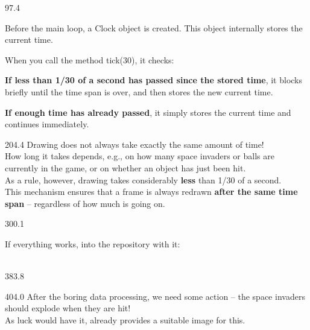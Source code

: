 \documentclass{aslab}
\begin{document}
\begin{region}[x=74.7,right=0,pitch=13.3]{97.4}
\begin{dotlist}
\item Before the main loop, a Clock object is created. This object
  internally stores the current time.
\item When you call the method tick(30), it checks:
  \begin{dotlist}
  \item \textbf{If less than 1/30 of a second has passed since the stored
    time}, it blocks briefly until the time span is over, and then stores
    the new current time.
  \item \textbf{If enough time has already passed}, it simply stores the
    current time and continues immediately.
  \end{dotlist}
\end{dotlist}
\end{region}

\begin{region}[x=74.7,right=0,pitch=13.75]{204.4}
Drawing does not always take exactly the same amount of time!\\
How long it takes depends, e.g., on how many space invaders or balls are
currently in the game, or on whether an object has just been hit.\\
As a rule, however, drawing takes considerably \textbf{less} than 1/30 of a
second.\\
This mechanism ensures that a frame is always redrawn \textbf{after the same
time span} -- regardless of how much is going on.
\end{region}

\begin{region}[pitch=13.45]{300.1}
\begin{tasks}[start=3]
\item If everything works, into the repository with it:\\
  \\
\end{tasks}
\end{region}

\begin{region}{383.8}
\end{region}

\begin{region}[pitch=13.3]{404.0}
After the boring data processing, we need some action -- the space invaders
should explode when they are hit!\\
As luck would have it,  already provides a suitable
image for this.
\end{region}
\end{document}
